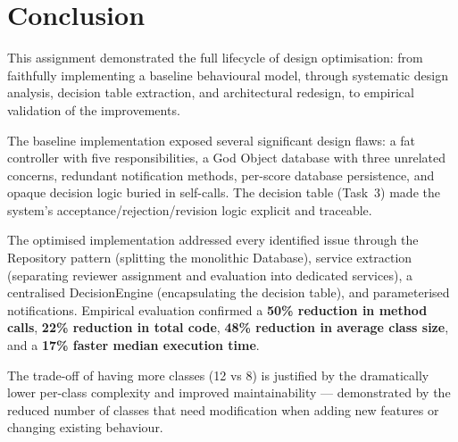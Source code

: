 \documentclass[12pt, a4paper]{article}
\begin{document}
\section{Conclusion}
\label{sec:conclusion}

This assignment demonstrated the full lifecycle of design optimisation: from faithfully implementing a baseline behavioural model, through systematic design analysis, decision table extraction, and architectural redesign, to empirical validation of the improvements.

The baseline implementation exposed several significant design flaws: a fat controller with five responsibilities, a God Object database with three unrelated concerns, redundant notification methods, per-score database persistence, and opaque decision logic buried in self-calls. The decision table (Task~3) made the system's acceptance/rejection/revision logic explicit and traceable.

The optimised implementation addressed every identified issue through the Repository pattern (splitting the monolithic Database), service extraction (separating reviewer assignment and evaluation into dedicated services), a centralised DecisionEngine (encapsulating the decision table), and parameterised notifications. Empirical evaluation confirmed a \textbf{50\% reduction in method calls}, \textbf{22\% reduction in total code}, \textbf{48\% reduction in average class size}, and a \textbf{17\% faster median execution time}.

The trade-off of having more classes (12 vs 8) is justified by the dramatically lower per-class complexity and improved maintainability --- demonstrated by the reduced number of classes that need modification when adding new features or changing existing behaviour.
\end{document}
